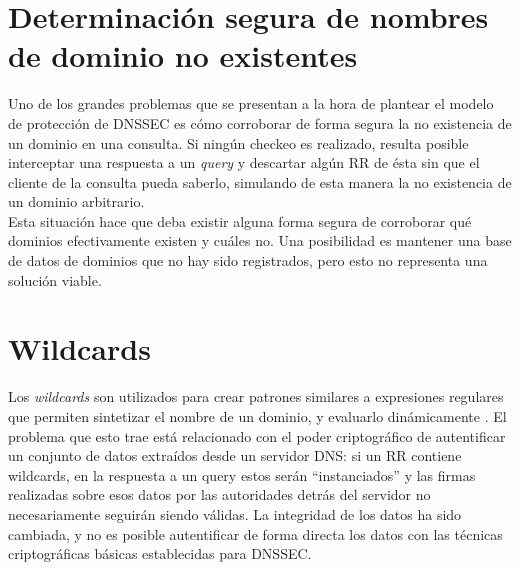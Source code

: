 \section{Determinaci\'on segura de nombres de dominio no existentes}

Uno de los grandes problemas que se presentan a la hora de plantear el modelo
de protecci\'on de DNSSEC es c\'omo corroborar de forma segura la no existencia de
un dominio en una consulta. Si ning\'un checkeo es realizado, resulta posible
interceptar una respuesta a un \textit{query} y descartar alg\'un RR de \'esta sin que
el cliente de la consulta pueda saberlo, simulando de esta manera la no existencia de un dominio arbitrario.\\
Esta situaci\'on hace que deba existir alguna forma segura de corroborar qu\'e dominios
efectivamente existen y cu\'ales no. Una posibilidad es mantener una base de
datos de dominios que no hay sido registrados, pero esto no representa una
soluci\'on viable.

\section{Wildcards}

Los \textit{wildcards} son utilizados para crear patrones similares a
expresiones regulares que permiten sintetizar el nombre de un dominio, y
evaluarlo din\'amicamente \cite{rfc1034}. El problema que esto trae est\'a
relacionado con el poder criptogr\'afico de autentificar un conjunto de datos
extra\'idos desde un servidor DNS: si un RR contiene wildcards, en la respuesta a
un query estos ser\'an ``instanciados'' y las firmas realizadas sobre esos datos
por las autoridades detr\'as del servidor no necesariamente seguir\'an siendo
v\'alidas. La integridad de los datos ha sido cambiada, y no es posible autentificar de forma
directa los datos con las t\'ecnicas criptogr\'aficas b\'asicas
establecidas para DNSSEC.
